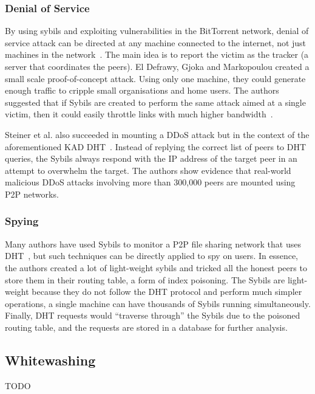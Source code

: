 \subsubsection{Denial of Service}
By using sybils and exploiting vulnerabilities in the BitTorrent network, denial
of service attack can be directed at any machine connected to the internet, not
just machines in the network~\cite{sia2006ddos}. The main idea is to report the
victim as the tracker (a server that coordinates the peers). El Defrawy, Gjoka
and Markopoulou created a small scale proof-of-concept attack. Using only one
machine, they could generate enough traffic to cripple small organisations and
home users. The authors suggested that if Sybils are created to perform the same
attack aimed at a single victim, then it could easily throttle links with much
higher bandwidth~\cite{el2007bottorrent}.

Steiner et al. also succeeded in mounting a DDoS attack but in the context of
the aforementioned KAD DHT~\cite{steiner2007exploiting}. Instead of replying the
correct list of peers to DHT queries, the Sybils always respond with the IP
address of the target peer in an attempt to overwhelm the target. The authors
show evidence that real-world malicious DDoS attacks involving more than 300,000
peers are mounted using P2P networks.

\subsubsection{Spying}
Many authors have used Sybils to monitor a P2P file sharing network that uses
DHT~\cite{holz2008measurements, steiner2007exploiting}, but such techniques can
be directly applied to spy on users. In essence, the authors created a lot of
light-weight sybils and tricked all the honest peers to store them in their
routing table, a form of index poisoning. The Sybils are light-weight because
they do not follow the DHT protocol and perform much simpler operations, a
single machine can have thousands of Sybils running simultaneously. Finally, DHT
requests would ``traverse through'' the Sybils due to the poisoned routing
table, and the requests are stored in a database for further analysis.

\subsection{Whitewashing}

TODO~\cite{feldman2004free}


